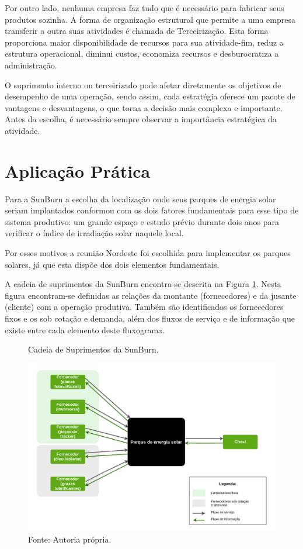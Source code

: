 Por outro lado, nenhuma empresa faz tudo que é necessário para fabricar seus produtos sozinha. A forma de organização estrutural que permite a uma empresa transferir a outra suas atividades é chamada de Terceirização. Esta forma proporciona maior disponibilidade de recursos para sua atividade-fim, reduz a estrutura operacional, diminui custos, economiza recursos e desburocratiza a administração.

\par O suprimento interno ou terceirizado pode afetar diretamente os objetivos de desempenho de uma operação, sendo assim, cada estratégia oferece um pacote de vantagens e desvantagens, o que torna a decisão mais complexa e importante. Antes da escolha, é necessário sempre observar a importância estratégica da atividade.


\section{Aplicação Prática}
\label{sec:projetos_de_novas_aplicacao}
Para a SunBurn a escolha da localização onde seus parques de energia solar seriam implantados conformou com os dois fatores fundamentais para esse tipo de sistema produtivo: um grande espaço e estudo prévio durante dois anos para verificar o índice de irradiação solar naquele local.
\par Por esses motivos a reunião Nordeste foi escolhida para implementar os parques solares, já que esta dispõe dos dois elementos fundamentais.

\par A cadeia de suprimentos da SunBurn encontra-se descrita na Figura \ref{fig:cadeia_suprimentos_sunburn}. Nesta figura encontram-se definidas as relações da montante (fornecedores) e da jusante (cliente) com a operação produtiva. Também são identificados os fornecedores fixos e os sob cotação e demanda, além dos fluxos de serviço e de informação que existe entre cada elemento deste fluxograma.


\begin{figure}[H]
    \centering
    \caption{Cadeia de Suprimentos da SunBurn.}
    \includegraphics[width = \textwidth]{images/cadeia_suprimentos_sunburn.png}
    \caption*{Fonte: Autoria própria.}
    \label{fig:cadeia_suprimentos_sunburn}
\end{figure}
